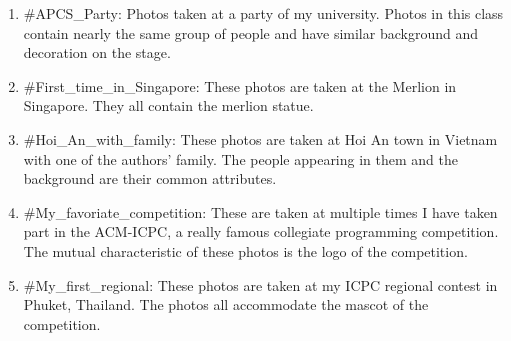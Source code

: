 \begin{enumerate}

\item \#APCS\_Party: Photos taken at a party of my university. Photos in this class contain nearly the same group of people and have similar background and decoration on the stage.
\item \#First\_time\_in\_Singapore: These photos are taken at the Merlion in Singapore. They all contain the merlion statue.
\item \#Hoi\_An\_with\_family: These photos are taken at Hoi An town in Vietnam with one of the authors' family. The people appearing in them and the background are their common attributes.
\item \#My\_favoriate\_competition: These are taken at multiple times I have taken part in the ACM-ICPC, a really famous collegiate programming competition. The mutual characteristic of these photos is the logo of the competition.
\item \#My\_first\_regional: These photos are taken at my ICPC regional contest in Phuket, Thailand. The photos all accommodate the mascot of the competition.

\end{enumerate}

